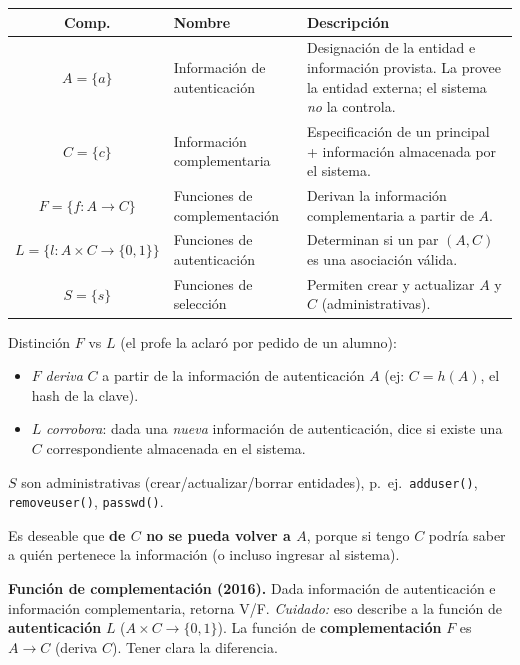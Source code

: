 \documentclass[../main.tex]{subfiles}
\begin{document}
\begin{center}
\begin{tabular}{c l p{8.2cm}}
\toprule
\textbf{Comp.} & \textbf{Nombre} & \textbf{Descripción} \\
\midrule
$A=\{a\}$ & Información de autenticación & Designación de la entidad e información provista. La provee la entidad externa; el sistema \emph{no} la controla. \\
$C=\{c\}$ & Información complementaria & Especificación de un principal + información almacenada por el sistema. \\
$F=\{f: A\to C\}$ & Funciones de complementación & Derivan la información complementaria a partir de $A$. \\
$L=\{l: A\times C\to\{0,1\}\}$ & Funciones de autenticación & Determinan si un par $(A,C)$ es una asociación válida. \\
$S=\{s\}$ & Funciones de selección & Permiten crear y actualizar $A$ y $C$ (administrativas). \\
\bottomrule
\end{tabular}
\end{center}

\begin{destacado}
Distinción $F$ vs $L$ (el profe la aclaró por pedido de un alumno):
\begin{itemize}[itemsep=1pt]
  \item \textbf{$F$} \emph{deriva} $C$ a partir de la información de autenticación $A$ (ej: $C=h(A)$, el hash de la clave).
  \item \textbf{$L$} \emph{corrobora}: dada una \emph{nueva} información de autenticación, dice si existe una $C$ correspondiente almacenada en el sistema.
\end{itemize}
$S$ son administrativas (crear/actualizar/borrar entidades), p.\ ej.\ \texttt{adduser()}, \texttt{removeuser()}, \texttt{passwd()}.
\end{destacado}

Es deseable que \textbf{de $C$ no se pueda volver a $A$}, porque si tengo $C$ podría saber a quién pertenece la información (o incluso ingresar al sistema).

\begin{examen}
\textbf{Función de complementación (2016).} Dada información de autenticación e información complementaria, retorna V/F. \emph{Cuidado:} eso describe a la función de \textbf{autenticación} $L$ ($A\times C\to\{0,1\}$). La función de \textbf{complementación} $F$ es $A\to C$ (deriva $C$). Tener clara la diferencia.
\end{examen}
\end{document}
